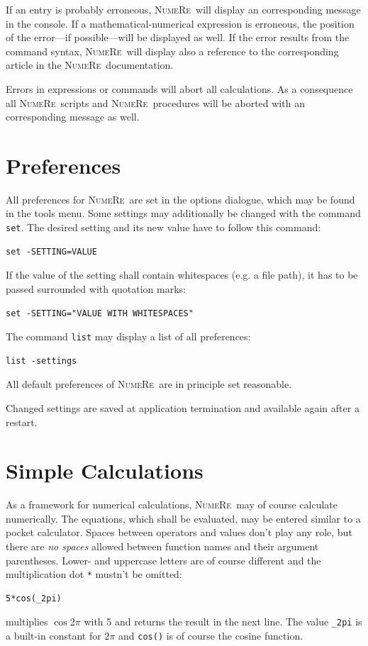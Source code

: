 \documentclass[DIV=14,headsepline,footsepline]{scrbook}
\newcommand{\NR}{\textsc{Nu\-me\-Re}}
\begin{document}
				If an entry is probably erroneous, \NR\ will display an corresponding message in the console. If a mathematical-numerical expression is erroneous, the position of the error---if possible---will be displayed as well. If the error results from the command syntax, \NR\ will display also a reference to the corresponding article in the \NR\ documentation.
				
				Errors in expressions or commands will abort all calculations. As a consequence all \NR\ scripts and \NR\ procedures will be aborted with an corresponding message as well.
			\section{Preferences}
				All preferences for \NR\ are set in the options dialogue, which may be found in the tools menu. Some settings may additionally be changed with the command \verb+set+. The desired setting and its new value have to follow this command:
				\begin{lstlisting}
set -SETTING=VALUE
				\end{lstlisting}
				If the value of the setting shall contain whitespaces (e.g. a file path), it has to be passed surrounded with quotation marks:
				\begin{lstlisting}
set -SETTING="VALUE WITH WHITESPACES"
				\end{lstlisting}
				The command \verb+list+ may display a list of all preferences:
				\begin{lstlisting}
list -settings
				\end{lstlisting}
				All default preferences of \NR\ are in principle set reasonable.
				
				Changed settings are saved at application termination and available again after a restart.
			\section{Simple Calculations}
				As a framework for numerical calculations, \NR\ may of course calculate numerically. The equations, which shall be evaluated, may be entered similar to a pocket calculator. Spaces between operators and values don't play any role, but there are \emph{no spaces} allowed between function names and their argument parentheses. Lower- and uppercase letters are of course different and the multiplication dot \verb+*+ mustn't be omitted:
				\begin{lstlisting}
5*cos(_2pi)
				\end{lstlisting}
				multiplies $\cos2\pi$ with 5 and returns the result in the next line. The value \verb+_2pi+ is a built-in constant for $2\pi$ and \verb+cos()+ is of course the cosine function.
\end{document}
